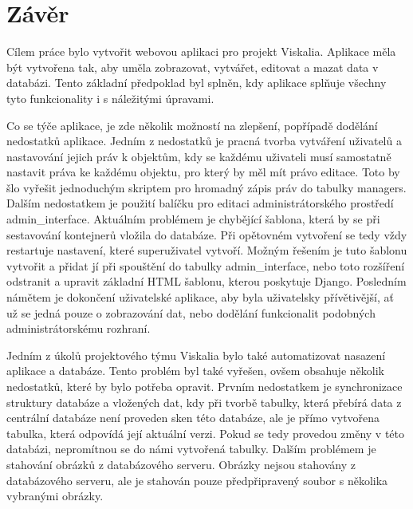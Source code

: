 \chapter*{Závěr}
\label{5-zaver}

Cílem práce bylo vytvořit webovou aplikaci pro projekt
Viskalia. Aplikace měla být vytvořena tak, aby uměla zobrazovat,
vytvářet, editovat a mazat data v databázi. Tento základní předpoklad
byl splněn, kdy aplikace splňuje všechny tyto funkcio\-nality i s
náležitými úpravami.

Co se týče aplikace, je zde několik možností na zlepšení, popřípadě
dodělání nedostatků aplikace. Jedním z nedostatků je pracná tvorba
vytváření uživatelů a nastavování jejich práv k objektům, kdy se
každému uživateli musí samostatně nastavit práva ke každému objektu,
pro který by měl mít právo editace. Toto by šlo vyřešit jednoduchým
skriptem pro hromadný zápis práv do tabulky managers. Dalším
nedostatkem je použití balíčku pro editaci administrátorského
prostředí admin\_interface. Aktuálním problémem je chybějící šablona, která
by se při sestavování kontejnerů vložila do databáze. Při opětovném
vytvoření se tedy vždy restartuje nastavení, které superuživatel
vytvoří. Možným řešením je tuto šablonu vytvořit a přidat jí při
spouštění do tabulky admin\_interface, nebo toto rozšíření odstranit a
upravit základní HTML šablonu, kterou poskytuje Django. Posledním
námětem je dokončení uživatelské aplikace, aby byla uživatelsky
přívětivější, ať už se jedná pouze o zobrazování dat, nebo dodělání
funkcionalit podobných administrátorskému rozhraní.

Jedním z úkolů projektového týmu Viskalia bylo také automatizovat
nasazení aplikace a databáze. Tento problém byl také vyřešen, ovšem
obsahuje několik nedostatků, které by bylo potřeba opravit. Prvním
nedostatkem je synchronizace struktury databáze a vložených dat, kdy
při tvorbě tabulky, která přebírá data z centrální databáze není
proveden sken této databáze, ale je přímo vytvořena tabulka, která
odpovídá její aktuální verzi. Pokud se tedy provedou změny v této
databázi, nepromítnou se do námi vytvořená tabulky. Dalším problémem
je stahování obrázků z databázového serveru. Obrázky nejsou stahovány
z databázového serveru, ale je stahován pouze předpřipravený soubor s
několika vybranými obrázky.

